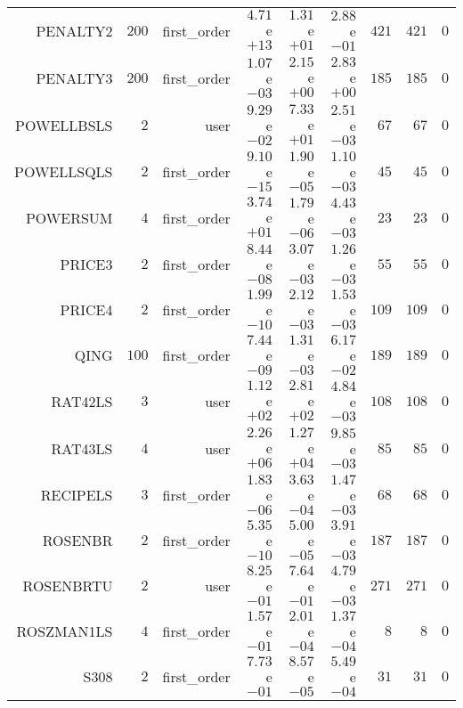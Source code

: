 \begin{longtable}{rrrrrrrrr}
PENALTY2 & \(   200\) & first\_order & \( 4.71\)e\(+13\) & \( 1.31\)e\(+01\) & \( 2.88\)e\(-01\) & \(   421\) & \(   421\) & \(     0\) \\
PENALTY3 & \(   200\) & first\_order & \( 1.07\)e\(-03\) & \( 2.15\)e\(+00\) & \( 2.83\)e\(+00\) & \(   185\) & \(   185\) & \(     0\) \\
POWELLBSLS & \(     2\) & user & \( 9.29\)e\(-02\) & \( 7.33\)e\(+01\) & \( 2.51\)e\(-03\) & \(    67\) & \(    67\) & \(     0\) \\
POWELLSQLS & \(     2\) & first\_order & \( 9.10\)e\(-15\) & \( 1.90\)e\(-05\) & \( 1.10\)e\(-03\) & \(    45\) & \(    45\) & \(     0\) \\
POWERSUM & \(     4\) & first\_order & \( 3.74\)e\(+01\) & \( 1.79\)e\(-06\) & \( 4.43\)e\(-03\) & \(    23\) & \(    23\) & \(     0\) \\
PRICE3 & \(     2\) & first\_order & \( 8.44\)e\(-08\) & \( 3.07\)e\(-03\) & \( 1.26\)e\(-03\) & \(    55\) & \(    55\) & \(     0\) \\
PRICE4 & \(     2\) & first\_order & \( 1.99\)e\(-10\) & \( 2.12\)e\(-03\) & \( 1.53\)e\(-03\) & \(   109\) & \(   109\) & \(     0\) \\
QING & \(   100\) & first\_order & \( 7.44\)e\(-09\) & \( 1.31\)e\(-03\) & \( 6.17\)e\(-02\) & \(   189\) & \(   189\) & \(     0\) \\
RAT42LS & \(     3\) & user & \( 1.12\)e\(+02\) & \( 2.81\)e\(+02\) & \( 4.84\)e\(-03\) & \(   108\) & \(   108\) & \(     0\) \\
RAT43LS & \(     4\) & user & \( 2.26\)e\(+06\) & \( 1.27\)e\(+04\) & \( 9.85\)e\(-03\) & \(    85\) & \(    85\) & \(     0\) \\
RECIPELS & \(     3\) & first\_order & \( 1.83\)e\(-06\) & \( 3.63\)e\(-04\) & \( 1.47\)e\(-03\) & \(    68\) & \(    68\) & \(     0\) \\
ROSENBR & \(     2\) & first\_order & \( 5.35\)e\(-10\) & \( 5.00\)e\(-05\) & \( 3.91\)e\(-03\) & \(   187\) & \(   187\) & \(     0\) \\
ROSENBRTU & \(     2\) & user & \( 8.25\)e\(-01\) & \( 7.64\)e\(-01\) & \( 4.79\)e\(-03\) & \(   271\) & \(   271\) & \(     0\) \\
ROSZMAN1LS & \(     4\) & first\_order & \( 1.57\)e\(-01\) & \( 2.01\)e\(-04\) & \( 1.37\)e\(-04\) & \(     8\) & \(     8\) & \(     0\) \\
S308 & \(     2\) & first\_order & \( 7.73\)e\(-01\) & \( 8.57\)e\(-05\) & \( 5.49\)e\(-04\) & \(    31\) & \(    31\) & \(     0\) \\

\end{longtable}
